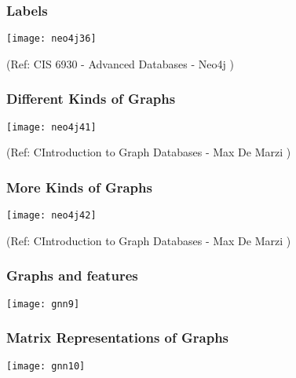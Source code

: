 \begin{frame}\frametitle{Labels}


\begin{center}
\texttt{[image: neo4j36]}
\end{center}	

{\tiny (Ref: CIS 6930 - Advanced Databases - Neo4j )}
\end{frame}


\begin{frame}\frametitle{Different Kinds of Graphs}

\begin{center}
\texttt{[image: neo4j41]}
\end{center}
 

{\tiny (Ref: CIntroduction to Graph Databases - Max De Marzi )}
\end{frame}

\begin{frame}\frametitle{More Kinds of Graphs}

\begin{center}
\texttt{[image: neo4j42]}
\end{center}
 

{\tiny (Ref: CIntroduction to Graph Databases - Max De Marzi )}
\end{frame}


\begin{frame}[fragile]\frametitle{Graphs and features}

\begin{center}
\texttt{[image: gnn9]}
\end{center}	  

\end{frame}

\begin{frame}[fragile]\frametitle{Matrix Representations of Graphs}

\begin{center}
\texttt{[image: gnn10]}
\end{center}	  

\end{frame}

